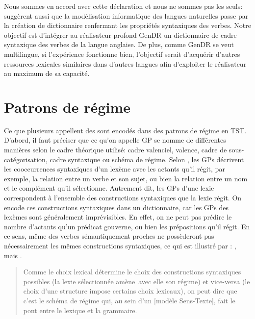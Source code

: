 Nous sommes en accord avec cette déclaration et nous ne sommes pas les seuls:  \cite{Korhonenlargesubcategorizationlexicon2006} suggèrent aussi que la modélisation informatique des langues naturelles passe par la création de dictionnaire renfermant les propriétés syntaxiques des verbes. Notre objectif est d'intégrer au réalisateur profond GenDR un dictionnaire de cadre syntaxique des verbes de la langue anglaise. De plus, comme GenDR se veut multilingue, si l'expérience fonctionne bien, l'objectif serait d'acquérir d'autres ressources lexicales similaires dans d'autres langues afin d'exploiter le réalisateur au maximum de sa capacité.

\section{Patrons de régime}\label{sec:gp}

Ce que plusieurs appellent des  sont encodés dans des patrons de régime en TST. D'abord, il faut préciser que ce qu'on appelle \ac{GP} se nomme de différentes manières selon le cadre théorique utilisé: cadre valenciel, valence, cadre de sous-catégorisation, cadre syntaxique ou schéma de régime. Selon \cite{MilicevicSchemaregimepont2009}, les \acp{GP} décrivent les cooccurrences syntaxiques d'un lexème avec les actants qu'il régit, par exemple, la relation entre un verbe et son sujet, ou bien la relation entre un nom et le complément qu'il sélectionne. Autrement dit, les \acp{GP} d'une lexie correspondent à l'ensemble des constructions syntaxiques que la lexie régit. On encode ces constructions syntaxiques dans un dictionnaire, car les \acp{GP} des lexèmes sont généralement imprévisibles. En effet, on ne peut pas prédire le nombre d'actants qu'un prédicat gouverne, ou bien les prépositions qu'il régit. En ce sens, même des verbes sémantiquement proches ne possèderont pas nécessairement les mêmes constructions syntaxiques, ce qui est illustré par \cite{MilicevicSchemaregimepont2009}: , mais .

\begin{quote}
Comme le choix lexical détermine le choix des constructions syntaxiques possibles (la lexie sélectionnée \og amène\fg\ avec elle son régime) et vice-versa (le choix d’une structure impose certains choix lexicaux), on peut dire que c’est le schéma de régime qui, au sein d’un [modèle Sens-Texte], fait le pont entre le lexique et la grammaire.
\end{quote}
\vspace{-\baselineskip}
\hfill
\cite[p.~105]{MilicevicSchemaregimepont2009}

